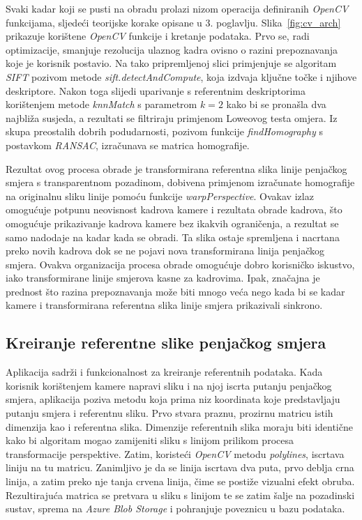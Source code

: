 Svaki kadar koji se pusti na obradu prolazi nizom operacija definiranih \textit{OpenCV} funkcijama, sljedeći teorijske korake opisane u 3. poglavlju. Slika~\ref{fig:cv_arch} prikazuje korištene \textit{OpenCV} funkcije i kretanje podataka. Prvo se, radi optimizacije, smanjuje rezolucija ulaznog kadra ovisno o razini prepoznavanja koje je korisnik postavio. Na tako pripremljenoj slici primjenjuje se algoritam \textit{SIFT} pozivom metode \textit{sift.detectAndCompute}, koja izdvaja ključne točke i njihove deskriptore. 
Nakon toga slijedi uparivanje s referentnim deskriptorima korištenjem metode \textit{knnMatch} s parametrom $k=2$ kako bi se pronašla dva najbliža susjeda, a rezultati se filtriraju primjenom Loweovog testa omjera. Iz skupa preostalih dobrih podudarnosti, pozivom funkcije \textit{findHomography} s postavkom \textit{RANSAC}, izračunava se matrica homografije.

Rezultat ovog procesa obrade je transformirana referentna slika linije penjačkog smjera s transparentnom pozadinom, dobivena primjenom izračunate homografije na originalnu sliku linije pomoću funkcije \textit{warpPerspective}. Ovakav izlaz omogućuje potpunu neovisnost kadrova kamere i rezultata obrade kadrova, što omogućuje prikazivanje kadrova kamere bez ikakvih ograničenja, a rezultat se samo nadodaje na kadar kada se obradi. 
Ta slika ostaje spremljena i nacrtana preko novih kadrova dok se ne pojavi nova transformirana linija penjačkog smjera. Ovakva organizacija procesa obrade omogućuje dobro korisničko iskustvo, iako transformirane linije smjerova kasne za kadrovima. Ipak, značajna je prednost što razina prepoznavanja može biti mnogo veća nego kada bi se kadar kamere i transformirana referentna slika linije smjera prikazivali sinkrono.

\subsection{Kreiranje referentne slike penjačkog smjera}

Aplikacija sadrži i funkcionalnost za kreiranje referentnih podataka. Kada korisnik korištenjem kamere napravi sliku i na njoj iscrta putanju penjačkog smjera, aplikacija poziva metodu koja prima niz koordinata koje predstavljaju putanju smjera i referentnu sliku. Prvo stvara praznu, prozirnu matricu istih dimenzija kao i referentna slika. Dimenzije referentnih slika moraju biti identične kako bi algoritam mogao zamijeniti sliku s linijom prilikom procesa transformacije perspektive. Zatim, koristeći \textit{OpenCV} metodu \textit{polylines}, iscrtava liniju na tu matricu. Zanimljivo je da se linija iscrtava dva puta, prvo deblja crna linija, a zatim preko nje tanja crvena linija, čime se postiže vizualni efekt obruba. Rezultirajuća matrica se pretvara u sliku s linijom te se zatim šalje na pozadinski sustav, sprema na \textit{Azure Blob Storage} i pohranjuje poveznicu u bazu podataka.


